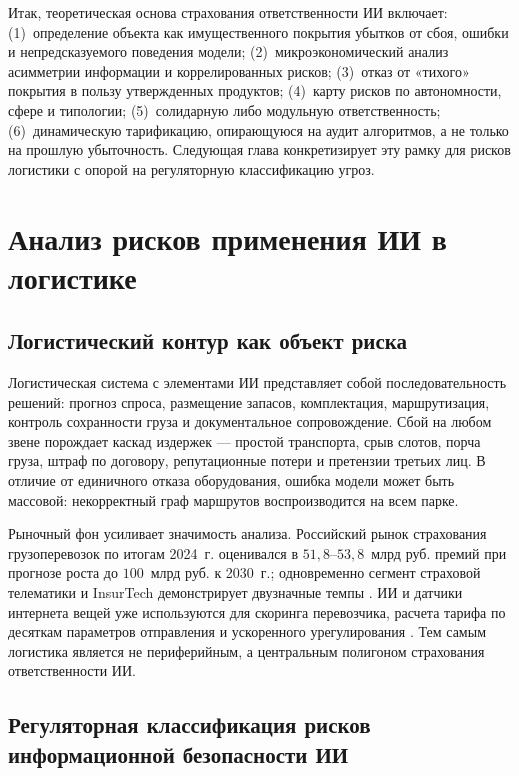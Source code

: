 \documentclass[a4paper,14pt]{extarticle}
\begin{document}
Итак, теоретическая основа страхования ответственности ИИ включает: (1)~определение объекта как имущественного покрытия убытков от сбоя, ошибки и непредсказуемого поведения модели; (2)~микроэкономический анализ асимметрии информации и коррелированных рисков; (3)~отказ от «тихого» покрытия в пользу утвержденных продуктов; (4)~карту рисков по автономности, сфере и типологии; (5)~солидарную либо модульную ответственность; (6)~динамическую тарификацию, опирающуюся на аудит алгоритмов, а не только на прошлую убыточность. Следующая глава конкретизирует эту рамку для рисков логистики с опорой на регуляторную классификацию угроз.

\section{Анализ рисков применения ИИ в логистике}

\subsection{Логистический контур как объект риска}

Логистическая система с элементами ИИ представляет собой последовательность решений: прогноз спроса, размещение запасов, комплектация, маршрутизация, контроль сохранности груза и документальное сопровождение. Сбой на любом звене порождает каскад издержек --- простой транспорта, срыв слотов, порча груза, штраф по договору, репутационные потери и претензии третьих лиц. В отличие от единичного отказа оборудования, ошибка модели может быть массовой: некорректный граф маршрутов воспроизводится на всем парке.

Рыночный фон усиливает значимость анализа. Российский рынок страхования грузоперевозок по итогам 2024~г. оценивался в $51{,}8$--$53{,}8$~млрд руб. премий при прогнозе роста до $100$~млрд руб. к 2030~г.; одновременно сегмент страховой телематики и InsurTech демонстрирует двузначные темпы \cite{insurtech}. ИИ и датчики интернета вещей уже используются для скоринга перевозчика, расчета тарифа по десяткам параметров отправления и ускоренного урегулирования \cite{insurtech, maglinova}. Тем самым логистика является не периферийным, а центральным полигоном страхования ответственности ИИ.

\subsection{Регуляторная классификация рисков информационной безопасности ИИ}
\end{document}
